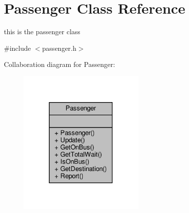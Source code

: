 \hypertarget{classPassenger}{}\section{Passenger Class Reference}
\label{classPassenger}


this is the passenger class  




{\ttfamily \#include $<$passenger.\+h$>$}



Collaboration diagram for Passenger\+:\nopagebreak
\begin{figure}[H]
\begin{center}
\leavevmode
\includegraphics[width=177pt]{classPassenger__coll__graph}
\end{center}
\end{figure}
